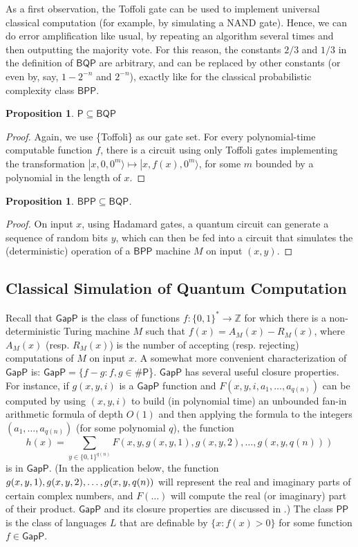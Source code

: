 \documentclass[12pt]{report}
\theoremstyle{plain}
\newtheorem{proposition}[theorem]{Proposition}
\theoremstyle{definition}
\renewcommand{\ket}[1]{|#1\rangle}
\begin{document}
As a first observation, the Toffoli gate can be used to implement universal classical computation (for example, by simulating a NAND gate).
Hence, we can do error amplification like usual, by repeating an algorithm several times and then outputting the majority vote.
 For this reason, the constants $2/3$ and $1/3$ in the definition of $\mathsf{BQP}$ are arbitrary, and can be replaced
by other constants (or even by, say, $1-2^{-n}$ and $2^{-n}$), exactly like for the classical probabilistic complexity class $\mathsf{BPP}$.

\begin{proposition}
$\mathsf{P} \subseteq \mathsf{BQP}$
\end{proposition}
\begin{proof}
Again, we use \{Toffoli\} as our gate set.  For every polynomial-time
computable function $f$, there is a circuit using only Toffoli gates
implementing the transformation
$\ket{x,0,0^m} \mapsto \ket{x,f(x),0^m}$, for some $m$ bounded by a
polynomial in the length of $x$.\end{proof}

\begin{proposition}
$\mathsf{BPP} \subseteq \mathsf{BQP}$.
\end{proposition}
\begin{proof}
On input $x$, using Hadamard gates, a quantum circuit can generate a sequence
of
random bits $y$, which can then be fed into a circuit that simulates the
(deterministic) operation of a $\mathsf{BPP}$ machine $M$ on input $(x,y)$.
\end{proof}

\subsection{Classical Simulation of Quantum Computation}

Recall that $\mathsf{GapP}$ is the class of functions $f:\{0,1\}^* \longrightarrow \mathbb{Z}$
for which there is a non-deterministic Turing machine $M$ such that $f(x)=A_M(x)-R_M(x)$,
where $A_M(x)$ (resp. $R_M(x)$) is the number of accepting (resp. rejecting) computations of $M$ on
input $x$.  A somewhat more convenient characterization of $\mathsf{GapP}$
is:  $\mathsf{GapP} = \{f-g : f,g \in \mathsf{\#P}$\}.  $\mathsf{GapP}$ has
several useful closure properties.  For instance, if $g(x,y,i)$
is a $\mathsf{GapP}$ function
and $F(x,y,i,a_1,\ldots,a_{q(n)})$ can be computed by using $(x,y,i)$ to
build (in polynomial time) an unbounded fan-in arithmetic formula of depth
$O(1)$ and then applying the formula to the integers
$(a_1,\ldots,a_{q(n)})$ (for some polynomial $q$), the function
\[
h(x) = \sum_{y \in \{0,1\}^{q(n)}} F(x,y,g(x,y,1),g(x,y,2),\ldots , g(x,y,q(n)))
\]
is in $\mathsf{GapP}$.  (In the application below, the function
$g(x,y,1),g(x,y,2), \penalty-2000 \ldots, g(x,y,q(n))$ will represent the real and
imaginary parts of certain complex numbers, and $F(\ldots)$ will compute the
real (or imaginary) part of their product.  $\mathsf{GapP}$ and its closure
properties are discussed in \cite{FFK94}.)
The class $\mathsf{PP}$ is the class of languages $L$ that are definable
by $\{x:f(x) >0\}$ for some function $f \in \mathsf{GapP}$.
\end{document}
